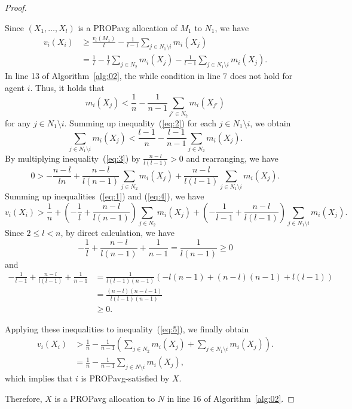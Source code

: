 \documentclass[11pt]{article}
\newcommand{\PROPavg}{\textsf{PROPavg}\xspace}
\begin{document}
\begin{proof}
\begin{description}
Since $(X_1,\ldots, X_l)$ is a \PROPavg allocation of $M_1$ to $N_1$, we have
\begin{align}\label{eq:1}
v_i(X_i) &\ge \frac{v_i(M_1)}{l} -\frac{1}{l-1}\sum_{j\in N_1\setminus i} m_i(X_j)\nonumber \\
&= \frac{1}{l}-\frac{1}{l}\sum_{j\in N_2} m_i(X_j)-\frac{1}{l-1}\sum_{j\in N_1\setminus i} m_i(X_j).
\end{align}
In line 13 of Algorithm~\ref{alg:02}, the while condition in line 7 does not hold for agent $i$.
Thus, it holds that 
\begin{equation}\label{eq:2}
m_i(X_j) < \frac{1}{n}-\frac{1}{n-1}\sum_{j'\in N_2} m_i(X_{j'})
\end{equation}
for any $j\in N_1\setminus i$.
Summing up  inequality~(\ref{eq:2}) for each $j\in N_1\setminus i$, we obtain
\begin{equation}\label{eq:3}
\sum_{j\in N_1\setminus i} m_i(X_j) < \frac{l-1}{n}-\frac{l-1}{n-1}\sum_{j\in N_2} m_i(X_j).
\end{equation}
By multiplying inequality~(\ref{eq:3}) by $\frac{n-l}{l(l-1)}>0$ and rearranging, we have
\begin{equation}\label{eq:4}
0  > -\frac{n-l}{ln}+\frac{n-l}{l(n-1)}\sum_{j\in N_2} m_i(X_j)+\frac{n-l}{l(l-1)}\sum_{j\in N_1\setminus i} m_i(X_j).
\end{equation}
Summing up inequalities~(\ref{eq:1}) and (\ref{eq:4}), we have 
\begin{equation}\label{eq:5}
v_i(X_i) > \frac{1}{n}+\left(-\frac{1}{l}+\frac{n-l}{l(n-1)}\right)\sum_{j\in N_2} m_i(X_j)+\left(-\frac{1}{l-1}+\frac{n-l}{l(l-1)}\right)\sum_{j\in N_1\setminus i} m_i(X_j).
\end{equation}
Since $2\le l < n$, 
by direct calculation, we have
\begin{equation*}
-\frac{1}{l}+\frac{n-l}{l(n-1)}+\frac{1}{n-1}= \frac{1}{l(n-1)} \ge 0
\end{equation*}
and
\begin{align*}
-\frac{1}{l-1}+\frac{n-l}{l(l-1)}+\frac{1}{n-1}&= \frac{1}{l(l-1)(n-1)}\left(-l(n-1)+(n-l)(n-1)+l(l-1)\right)\\
&=\frac{(n-l)(n-l-1)}{l(l-1)(n-1)} \\
& \ge 0.
\end{align*}

Applying these inequalities to inequality~(\ref{eq:5}), we finally obtain
\begin{align*}
v_i(X_i) &> \frac{1}{n}-\frac{1}{n-1}\left(\sum_{j\in N_2} m_i(X_j)+\sum_{j\in N_1\setminus i} m_i(X_j)\right).\\
&=\frac{1}{n}-\frac{1}{n-1}\sum_{j\in N\setminus i} m_i(X_j), 
\end{align*}
which implies that $i$ is \PROPavg-satisfied by $X$.
\end{description}
Therefore, $X$ is a \PROPavg allocation to $N$ in line 16 of Algorithm~\ref{alg:02}.
\end{proof}
\end{document}
